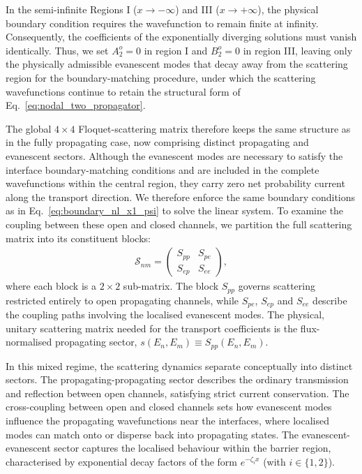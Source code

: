 \documentclass[aps,prb,onecolumn,longbibliography,nofootinbib,citeautoscript,10pt]{revtex4-2}
\begin{document}
In the semi-infinite Regions I ($x \rightarrow -\infty$) and III ($x \rightarrow +\infty$), the physical boundary condition requires the wavefunction to remain finite at infinity. Consequently, the coefficients of the exponentially diverging solutions must vanish identically. Thus, we set $A_2^o = 0$ in region I and $B_2^o = 0$ in region III, leaving only the physically admissible evanescent modes that decay away from the scattering region for the boundary-matching procedure, under which
the scattering wavefunctions continue to retain the structural form of Eq.~\eqref{eq:nodal_two_propagator}.

The global $4 \times 4$ Floquet-scattering matrix therefore keeps the same structure as in the fully propagating case, now comprising distinct propagating and evanescent sectors. Although the evanescent modes are necessary to satisfy the interface boundary-matching conditions and are included in the complete wavefunctions within the central region, they carry zero net probability current along the transport direction. We therefore enforce the same boundary conditions as in Eq.~\eqref{eq:boundary_nl_x1_psi} to solve the linear system. To examine the coupling between these open and closed channels, we partition the full scattering matrix into its constituent blocks:
\begin{align}
\mathcal{S}_{nm} = 
\begin{pmatrix}
	S_{pp} & S_{pe} \\ S_{ep} & S_{ee}
\end{pmatrix} , 
\label{eq:partitioneD_S_matrix}
\end{align}
where each block is a $2 \times 2$ sub-matrix. The block $S_{pp}$ governs scattering restricted entirely to open propagating channels, while $S_{pe}$, $S_{ep}$ and $S_{ee}$ describe the coupling paths involving the localised evanescent modes. The physical, unitary scattering matrix needed for the transport coefficients is the flux-normalised propagating sector, $s(E_n, E_m) \equiv S_{pp}(E_n, E_m)$.

In this mixed regime, the scattering dynamics separate conceptually into distinct sectors. The propagating-propagating sector describes the ordinary transmission and reflection between open channels, satisfying strict current conservation. The cross-coupling between open and closed channels sets how evanescent modes influence the propagating wavefunctions near the interfaces, where localised modes can match onto or disperse back into propagating states. The evanescent-evanescent sector captures the localised behaviour within the barrier region, characterised by exponential decay factors of the form $e^{-\zeta_i x}$ (with $i \in \{1,2\}$).
\end{document}
